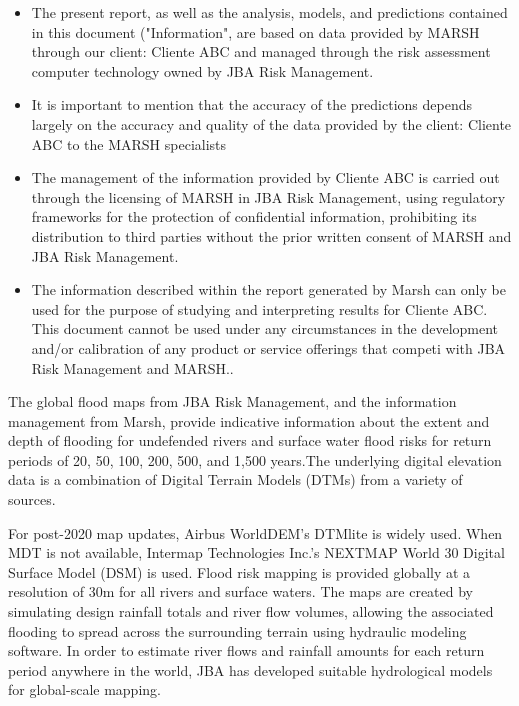 \documentclass[
]{article}
\begin{document}
\begin{itemize}
  \item {\fontsize{11}{13}\selectfont The present report, as well as the analysis, models,    and predictions contained in this document ("Information", are based on data provided by    MARSH through our client: Cliente ABC and managed through the risk         assessment computer technology owned by JBA Risk Management.}
  \item {\fontsize{11}{13}\selectfont It is important to mention that the accuracy of the     predictions depends largely on the accuracy and quality of the data provided by the         client: Cliente ABC to the MARSH specialists}
  \item {\fontsize{11}{13}\selectfont The management of the information provided by Cliente ABC is carried out through the licensing of MARSH in JBA Risk             Management, using regulatory frameworks for the protection of confidential information,     prohibiting its distribution to third parties without the prior written consent of MARSH    and JBA Risk Management.}
  \item {\fontsize{11}{13}\selectfont The information described within the report generated   by Marsh can only be used for the purpose of studying and interpreting results for Cliente ABC. This document cannot be used under any circumstances in the          development and/or calibration of any product or service offerings that competi with JBA    Risk Management and MARSH..}
\end{itemize}

\fontsize{11}{13}\selectfont The global flood maps from JBA Risk
Management, and the information management from Marsh, provide
indicative information about the extent and depth of flooding for
undefended rivers and surface water flood risks for return periods of
20, 50, 100, 200, 500, and 1,500 years.The underlying digital elevation
data is a combination of Digital Terrain Models (DTMs) from a variety of
sources.

\fontsize{11}{13}\selectfont For post-2020 map updates, Airbus
WorldDEM's DTMlite is widely used. When MDT is not available, Intermap
Technologies Inc.'s NEXTMAP World 30 Digital Surface Model (DSM) is
used. Flood risk mapping is provided globally at a resolution of 30m for
all rivers and surface waters. The maps are created by simulating design
rainfall totals and river flow volumes, allowing the associated flooding
to spread across the surrounding terrain using hydraulic modeling
software. In order to estimate river flows and rainfall amounts for each
return period anywhere in the world, JBA has developed suitable
hydrological models for global-scale mapping.
\end{document}

